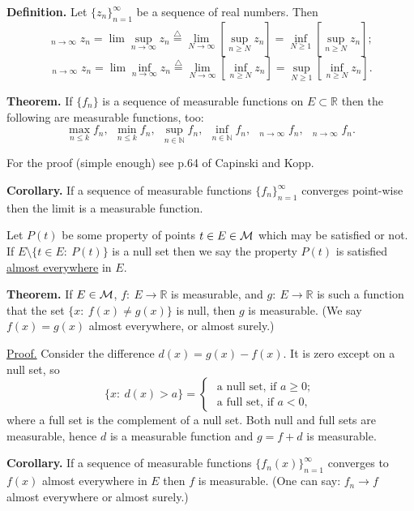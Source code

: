 \documentclass[a4paper,10pt]{article}
\def\NN{\mathbb{N}}
\def\RR{\mathbb{R}}
\def\liminf{\mathop{\underline{\lim}}}
\def\limsup{\mathop{\overline{\lim}}}
\newcommand{\1}[1]{\mathbf{1}_{\{#1\}}}
\newcommand{\defi}{\stackrel{\triangle}{=}}
\begin{document}
{\bf Definition.} Let $\{z_n\}_{n=1}^\infty$ be a sequence of real numbers. Then
  $$\limsup_{n\to\infty} z_n =\lim \sup_{n\to\infty} z_n \defi \lim_{N\to\infty}\left[\sup_{n\ge N} z_n\right]=\inf_{N\ge 1}\left[\sup_{n\ge N} z_n\right];$$
  $$\liminf_{n\to\infty} z_n =\lim \inf_{n\to\infty} z_n \defi \lim_{N\to\infty}\left[\inf_{n\ge N} z_n\right]=\sup_{N\ge 1}\left[\inf_{n\ge N} z_n\right].$$
\vspace{3mm}

{\bf Theorem.} If $\{f_n\}$ is a sequence of measurable functions on $E\subset\RR$ then the following are measurable functions, too:
  $$\max_{n\le k} f_n,~~\min_{n\le k} f_n,~~\sup_{n\in\NN}f_n,~~\inf_{n\in\NN}f_n,~~\limsup_{n\to\infty} f_n,~~\liminf_{n\to\infty} f_n.$$
\vspace{3mm}

For the proof (simple enough) see p.64 of Capinski and Kopp.\vspace{3mm}

{\bf Corollary.} If a sequence of measurable functions $\{f_n\}_{n=1}^\infty$ converges point-wise then the limit is a measurable function. \vspace{3mm}

Let $P(t)$ be some property of points $t\in E\in{\cal M}$ which may be satisfied or not. If $E\setminus\{t\in E:~P(t)\}$ is a null set then we say the property $P(t)$ is satisfied \underline{almost everywhere} in $E$.\vspace{3mm}

{\bf Theorem.} If $E\in{\cal M}$, $f:~E\to\RR$ is measurable, and $g:~E\to\RR$ is such a function that the set $\{x:~f(x)\ne g(x)\}$ is null, then $g$ is measurable. (We say $f(x)=g(x)$ almost everywhere, or almost surely.) \vspace{3mm}

\underline{Proof.}  Consider the difference $d(x)=g(x)-f(x)$. It is zero except on a null set, so
  $$\{x:~d(x)>a\}=\left\{\begin{array}{l}
\mbox{ a null set, if } a\ge 0; \\ \mbox{ a full set, if } a<0, \end{array}\right.$$
where a full set is the complement of a null set. Both null and full sets are measurable, hence $d$ is a measurable function and $g=f+d$ is measurable. \blacksquare \vspace{3mm}

{\bf Corollary.} If a sequence of measurable functions $\{f_n(x)\}_{n=1}^\infty$ converges to $f(x)$ almost everywhere in $E$ then $f$ is measurable. (One can say: $f_n\to f$ almost everywhere or almost surely.)
\vspace{3mm}
\end{document}
